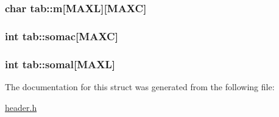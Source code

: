 \subsubsection[{m}]{\setlength{\rightskip}{0pt plus 5cm}char tab\+::m\mbox{[}{\bf M\+A\+X\+L}\mbox{]}\mbox{[}{\bf M\+A\+X\+C}\mbox{]}}\label{structtab_aef5f60a83f454259252159d8570abbc5}
\hypertarget{structtab_a31d5202f825583424eafb395ad1c37ff}{}
\subsubsection[{somac}]{\setlength{\rightskip}{0pt plus 5cm}int tab\+::somac\mbox{[}{\bf M\+A\+X\+C}\mbox{]}}\label{structtab_a31d5202f825583424eafb395ad1c37ff}
\hypertarget{structtab_ade732448e5e2e708199c819645ba3d5f}{}
\subsubsection[{somal}]{\setlength{\rightskip}{0pt plus 5cm}int tab\+::somal\mbox{[}{\bf M\+A\+X\+L}\mbox{]}}\label{structtab_ade732448e5e2e708199c819645ba3d5f}


The documentation for this struct was generated from the following file\+:\begin{DoxyCompactItemize}
\item 
\hyperlink{header_8h}{header.\+h}\end{DoxyCompactItemize}
